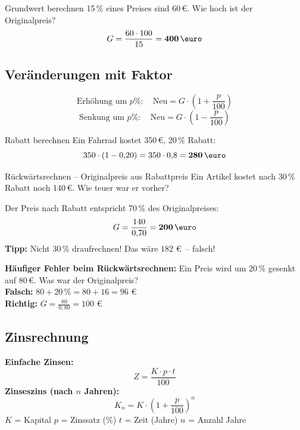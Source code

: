 \documentclass[12pt, a4paper]{article}
\begin{document}
\begin{examplebox}{Grundwert berechnen}
15\,\% eines Preises sind 60\,\euro. Wie hoch ist der Originalpreis?
\[
  G = \frac{60 \cdot 100}{15} = \mathbf{400\,\text{\euro}}
\]
\end{examplebox}

\subsection{Ver\"anderungen mit Faktor}

\begin{formulabox}
\[
  \text{Erh\"ohung um }p\%:\quad
  \boxed{\text{Neu} = G \cdot \left(1 + \frac{p}{100}\right)}
\]
\[
  \text{Senkung um }p\%:\quad
  \boxed{\text{Neu} = G \cdot \left(1 - \frac{p}{100}\right)}
\]
\end{formulabox}

\begin{examplebox}{Rabatt berechnen}
Ein Fahrrad kostet 350\,\euro, 20\,\% Rabatt:
\[
  350 \cdot (1 - 0{,}20) = 350 \cdot 0{,}8 = \mathbf{280\,\text{\euro}}
\]
\end{examplebox}

\begin{examplebox}{R\"uckw\"artsrechnen -- Originalpreis aus Rabattpreis}
Ein Artikel kostet nach 30\,\% Rabatt noch 140\,\euro. Wie teuer war er vorher?

Der Preis nach Rabatt entspricht 70\,\% des Originalpreises:
\[
  G = \frac{140}{0{,}70} = \mathbf{200\,\text{\euro}}
\]
\textbf{Tipp:} Nicht 30\,\% draufrechnen! Das w\"are $182$ \euro\ -- falsch!
\end{examplebox}

\begin{fehlerbox}
\textbf{H\"aufiger Fehler beim R\"uckw\"artsrechnen:}
Ein Preis wird um 20\,\% gesenkt auf 80\,\euro. Was war der Originalpreis?\\[0.2cm]
\textbf{Falsch:} $80 + 20\,\% = 80 + 16 = 96$ \euro \\
\textbf{Richtig:} $G = \frac{80}{0{,}80} = 100$ \euro
\end{fehlerbox}

\subsection{Zinsrechnung}

\begin{formulabox}
\textbf{Einfache Zinsen:}
\[
  \boxed{Z = \frac{K \cdot p \cdot t}{100}}
\]
\textbf{Zinseszins (nach $n$ Jahren):}
\[
  \boxed{K_n = K \cdot \left(1 + \frac{p}{100}\right)^n}
\]
$K$ = Kapital \quad $p$ = Zinssatz (\%) \quad $t$ = Zeit (Jahre) \quad $n$ = Anzahl Jahre
\end{formulabox}
\end{document}
